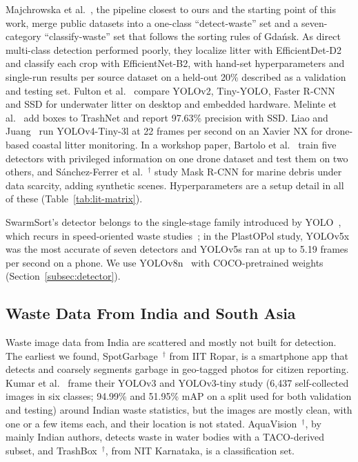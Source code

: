 Majchrowska et al.~\cite{majchrowska2022deep}, the pipeline closest to ours and the starting point of this work, merge public datasets into a one-class ``detect-waste'' set and a seven-category ``classify-waste'' set that follows the sorting rules of Gda\'{n}sk. As direct multi-class detection performed poorly, they localize litter with EfficientDet-D2 and classify each crop with EfficientNet-B2, with hand-set hyperparameters and single-run results per source dataset on a held-out 20\% described as a validation and testing set. Fulton et al.~\cite{fulton2019robotic} compare YOLOv2, Tiny-YOLO, Faster R-CNN and SSD for underwater litter on desktop and embedded hardware. Melinte et al.~\cite{melinte2020deep} add boxes to TrashNet and report 97.63\% precision with SSD. Liao and Juang~\cite{liao2022realtime} run YOLOv4-Tiny-3l at 22 frames per second on an Xavier NX for drone-based coastal litter monitoring. In a workshop paper, Bartolo et al.~\cite{bartolo2025learning} train five detectors with privileged information on one drone dataset and test them on two others, and S\'{a}nchez-Ferrer et al.~\cite{sanchezferrer2023experimental}$^{\dagger}$ study Mask R-CNN for marine debris under data scarcity, adding synthetic scenes. Hyperparameters are a setup detail in all of these (Table~\ref{tab:lit-matrix}).

SwarmSort's detector belongs to the single-stage family introduced by YOLO~\cite{redmon2016you}, which recurs in speed-oriented waste studies~\cite{kumar2021novel,kraft2021autonomous,liao2022realtime,cordova2022litter}; in the PlastOPol study, YOLOv5x was the most accurate of seven detectors and YOLOv5s ran at up to 5.19 frames per second on a phone. We use YOLOv8n~\cite{jocher2023ultralytics} with COCO-pretrained weights~\cite{lin2014microsoft} (Section~\ref{subsec:detector}).

\subsection{Waste Data From India and South Asia}
\label{subsec:rw-india}

Waste image data from India are scattered and mostly not built for detection. The earliest we found, SpotGarbage~\cite{mittal2016spotgarbage}$^{\dagger}$ from IIT Ropar, is a smartphone app that detects and coarsely segments garbage in geo-tagged photos for citizen reporting. Kumar et al.~\cite{kumar2021novel} frame their YOLOv3 and YOLOv3-tiny study (6,437 self-collected images in six classes; 94.99\% and 51.95\% mAP on a split used for both validation and testing) around Indian waste statistics, but the images are mostly clean, with one or a few items each, and their location is not stated. AquaVision~\cite{panwar2020aquavision}$^{\dagger}$, by mainly Indian authors, detects waste in water bodies with a TACO-derived subset, and TrashBox~\cite{kumsetty2022trashbox}$^{\dagger}$, from NIT Karnataka, is a classification set.


